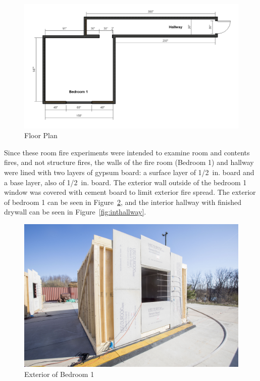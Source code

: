 \documentclass[12pt,oneside]{book}
\begin{document}
\begin{figure}[H]
\centering
\includegraphics[width=\textwidth]{Figures/Structures/floorplan.png}
\caption{Floor Plan}
\label{fig:floorplan}
\end{figure}

Since these room fire experiments were intended to examine room and contents fires, and not structure fires, the walls of the fire room (Bedroom 1) and hallway were lined with two layers of gypsum board: a surface layer of 1/2~in. board and a base layer, also of 1/2~in. board. The exterior wall outside of the bedroom 1 window was covered with cement board to limit exterior fire spread. The exterior of bedroom 1 can be seen in Figure~\ref{fig:bedroomext}, and the interior hallway with finished drywall can be seen in Figure~\ref{fig:inthallway}.

\begin{figure}[H]
\centering
\includegraphics[width=\textwidth]{Figures/Structures/bedroomext.png}
\caption{Exterior of Bedroom 1}
\label{fig:bedroomext}
\end{figure}
\end{document}
